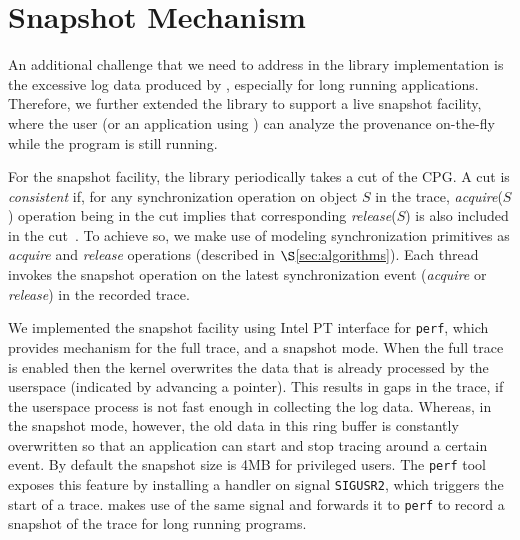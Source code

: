 \section{Snapshot Mechanism}
\label{sec:snapshot}
An additional challenge that we need to address in the library implementation is the excessive log data produced by \intelpt, especially for long running applications. Therefore, we further extended the library to support a live snapshot facility, where the user (or an application using \projecttitle) can analyze the provenance on-the-fly while the program is still running.

For the snapshot facility, the library periodically takes a cut of the CPG. A cut is {\em consistent} if, for any synchronization operation on object $S$ in the trace,  {\em acquire}($S$) operation being in the cut implies that corresponding {\em release}($S$) is also included in the cut~\cite{chandy-lamport}.  To achieve so, we make use of modeling synchronization primitives as {\em acquire} and {\em release} operations (described in $\S$\ref{sec:algorithms}). Each thread invokes the snapshot operation on the latest synchronization event ({\em acquire} or {\em release}) in the recorded trace.

We implemented the snapshot facility using Intel PT interface for {\tt perf},
which provides mechanism for the full trace, and a snapshot mode.
When the full trace is enabled then the kernel overwrites the data that is already processed by
the userspace (indicated by advancing a pointer). This results in gaps in the
trace, if the userspace process is not fast enough in collecting the log data. Whereas, in the snapshot mode, however,
the old data in this ring buffer is constantly overwritten so that an application
can start and stop tracing around a certain event. By default the snapshot size is 4MB for
privileged users. The {\tt perf} tool exposes this feature by installing a handler on
signal {\tt SIGUSR2}, which triggers the start of a trace. \projecttitle makes use of the same signal
and forwards it to {\tt perf} to record a  snapshot of the trace for long running programs.
